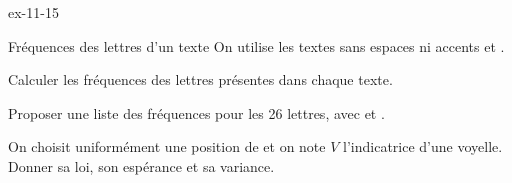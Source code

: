 \begin{blocLivre}{ex-11-15}
\begin{exercice}[3]{Fréquences des lettres d'un texte}
On utilise les textes sans espaces ni accents  et .\begin{questions}
\item Calculer les fréquences des lettres présentes dans chaque texte.
\item Proposer une liste des fréquences pour les 26 lettres, avec  et .
\item On choisit uniformément une position de  et on note $V$ l’indicatrice d’une voyelle. Donner sa loi, son espérance et sa variance.
\end{questions}
\end{exercice}
\end{blocLivre}

